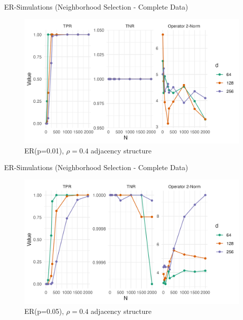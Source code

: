 \documentclass{beamer}
\begin{document}
\begin{frame}{ER-Simulations (Neighborhood Selection - Complete Data)}
    \begin{figure}
        \centering 
        \includegraphics[scale=0.65]{glasso_complete_ERmb_FixN_01.png}
        \caption{ER(p=0.01), $\rho=0.4$ adjacency structure}
    \end{figure}
\end{frame}


\begin{frame}{ER-Simulations (Neighborhood Selection - Complete Data)}
    \begin{figure}
        \centering 
        \includegraphics[scale=0.65]{glasso_complete_ERmb_FixN_05.png}
        \caption{ER(p=0.05), $\rho=0.4$ adjacency structure}
    \end{figure}
\end{frame}
\end{document}
